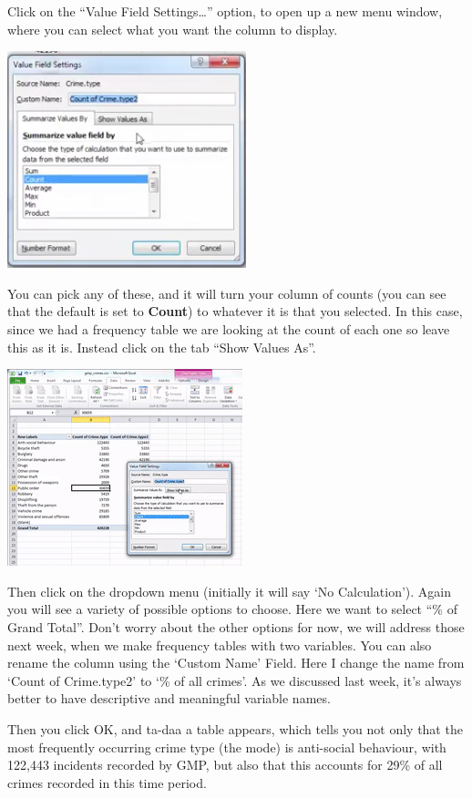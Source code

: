 \documentclass[
]{book}
\begin{document}
Click on the ``Value Field Settings\ldots{}'' option, to open up a new menu window, where you can select what you want the column to display.

\includegraphics{imgs/vfs_menu.png}

You can pick any of these, and it will turn your column of counts (you can see that the default is set to \textbf{Count}) to whatever it is that you selected. In this case, since we had a frequency table we are looking at the count of each one so leave this as it is. Instead click on the tab ``Show Values As''.

\includegraphics{imgs/perc_menu.gif}

Then click on the dropdown menu (initially it will say `No Calculation'). Again you will see a variety of possible options to choose. Here we want to select ``\% of Grand Total''. Don't worry about the other options for now, we will address those next week, when we make frequency tables with two variables. You can also rename the column using the `Custom Name' Field. Here I change the name from `Count of Crime.type2' to `\% of all crimes'. As we discussed last week, it's always better to have descriptive and meaningful variable names.

Then you click OK, and ta-daa a table appears, which tells you not only that the most frequently occurring crime type (the mode) is anti-social behaviour, with 122,443 incidents recorded by GMP, but also that this accounts for 29\% of all crimes recorded in this time period.
\end{document}
